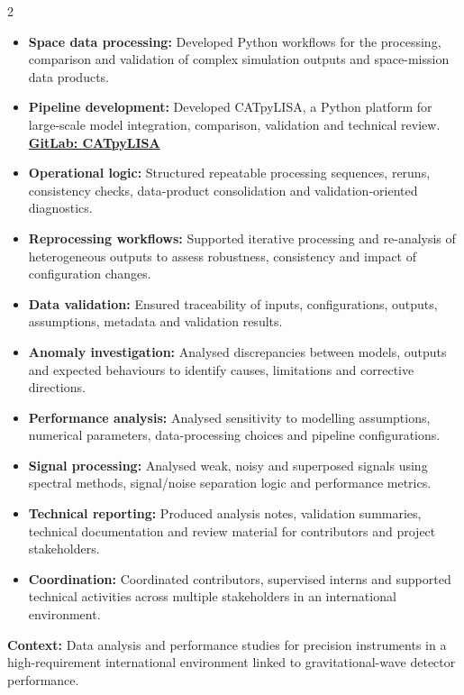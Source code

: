 \documentclass[8pt,a4paper,ragged2e,withhyper]{altacv}
\begin{document}
\begin{paracol}{2}
\begin{itemize}
  \item \textbf{Space data processing:} Developed Python workflows for the processing, comparison and validation of complex simulation outputs and space-mission data products.
  \item \textbf{Pipeline development:} Developed CATpyLISA, a Python platform for large-scale model integration, comparison, validation and technical review.
  \textcolor{DarkPastelRed}{\href{https://gitlab.oca.eu/gboileau/lisa_l3_tools}{\bf GitLab: CATpyLISA}}
  \item \textbf{Operational logic:} Structured repeatable processing sequences, reruns, consistency checks, data-product consolidation and validation-oriented diagnostics.
  \item \textbf{Reprocessing workflows:} Supported iterative processing and re-analysis of heterogeneous outputs to assess robustness, consistency and impact of configuration changes.
  \item \textbf{Data validation:} Ensured traceability of inputs, configurations, outputs, assumptions, metadata and validation results.
  \item \textbf{Anomaly investigation:} Analysed discrepancies between models, outputs and expected behaviours to identify causes, limitations and corrective directions.
  \item \textbf{Performance analysis:} Analysed sensitivity to modelling assumptions, numerical parameters, data-processing choices and pipeline configurations.
  \item \textbf{Signal processing:} Analysed weak, noisy and superposed signals using spectral methods, signal/noise separation logic and performance metrics.
  \item \textbf{Technical reporting:} Produced analysis notes, validation summaries, technical documentation and review material for contributors and project stakeholders.
  \item \textbf{Coordination:} Coordinated contributors, supervised interns and supported technical activities across multiple stakeholders in an international environment.
\end{itemize}

\divider


\textbf{Context:} Data analysis and performance studies for precision instruments in a high-requirement international environment linked to gravitational-wave detector performance.


\end{paracol}
\end{document}

